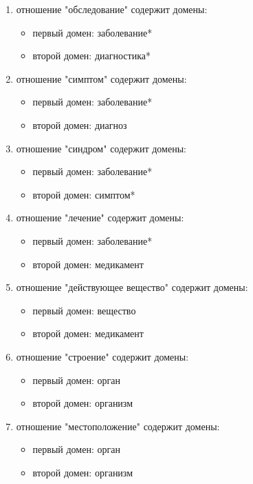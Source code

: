 \begin{enumerate}
	\item отношение "обследование" содержит домены:
	\begin{itemize}
		\item первый домен: заболевание*
		\item второй домен: диагностика*\\
	\end{itemize}
	
	\item отношение "симптом" содержит домены:
	\begin{itemize}
		\item первый домен: заболевание*
		\item второй домен: диагноз\\
	\end{itemize}
	
	\item отношение "синдром" содержит домены:
	\begin{itemize}
		\item первый домен: заболевание*
		\item второй домен: симптом*\\
	\end{itemize}
	
	\item отношение "лечение" содержит домены:
	\begin{itemize}
		\item первый домен: заболевание*
		\item второй домен: медикамент\\
	\end{itemize}
	
	\item отношение "действующее вещество" содержит домены:
	\begin{itemize}
		\item первый домен: вещество
		\item второй домен: медикамент\\
	\end{itemize}
	
	\item отношение "строение" содержит домены:
	\begin{itemize}
		\item первый домен: орган
		\item второй домен: организм\\
	\end{itemize}
	
	\item отношение "местоположение" содержит домены:
	\begin{itemize}
		\item первый домен: орган
		\item второй домен: организм\\
	\end{itemize}
	
\end{enumerate}

